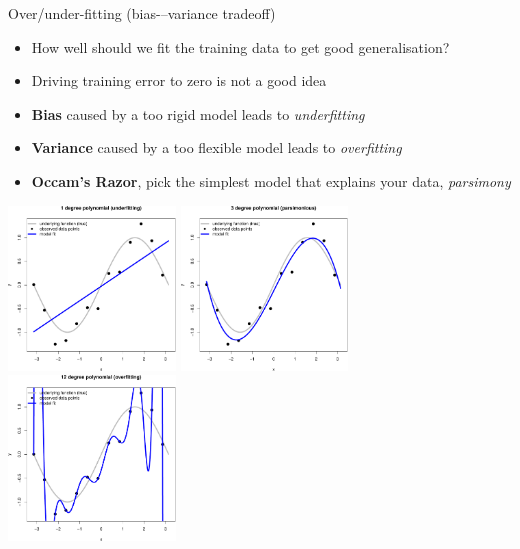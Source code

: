 \documentclass[pdf]{beamer}
\begin{document}
\begin{frame}{Over/under-fitting (bias-–variance tradeoff)}
\begin{itemize}\addtolength{\itemsep}{0.5\baselineskip}
\item How well should we fit the training data to get good generalisation?
\item Driving training error to zero is not a good idea
\item \textbf{Bias} caused by a too rigid model leads to \textit{underfitting}
\item \textbf{Variance} caused by a too flexible model leads to \textit{overfitting}
\item \textbf{Occam's Razor}, pick the simplest model that explains your data, \textit{parsimony}
\end{itemize}
\begin{center}
	\includegraphics[width=0.333\textwidth]{polyFit1.pdf}
	\includegraphics[width=0.333\textwidth]{polyFit3.pdf}
	\includegraphics[width=0.333\textwidth]{polyFit12.pdf}
\end{center}
\end{frame}
\end{document}
